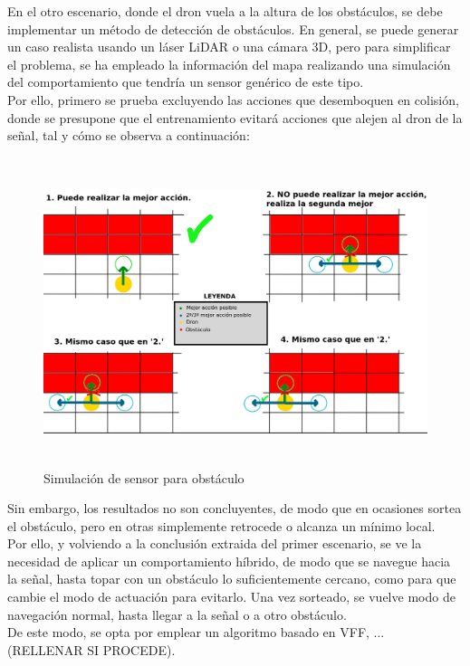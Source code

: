 En el otro escenario, donde el dron vuela a la altura de los obstáculos, se debe implementar un método de detección de obstáculos. En general, se puede generar un caso realista usando un láser LiDAR o una cámara 3D, pero para simplificar el problema, se ha empleado la información del mapa realizando una simulación del comportamiento que tendría un sensor genérico de este tipo.\\

Por ello, primero se prueba excluyendo las acciones que desemboquen en colisión, donde se presupone que el entrenamiento evitará acciones que alejen al dron de la señal, tal y cómo se observa a continuación:

\begin{figure} [H]
    \begin{center}
    \includegraphics[height=9cm]{imagenes/cap4/28_pseudosensor.png}
    \end{center}
    \caption[Simulación de sensor para obstáculo]{Simulación de sensor para obstáculo}
    \label{fig:pseudosensor}
\end{figure}

Sin embargo, los resultados no son concluyentes, de modo que en ocasiones sortea el obstáculo, pero en otras simplemente retrocede o alcanza un mínimo local.\\

Por ello, y volviendo a la conclusión extraida del primer escenario, se ve la necesidad de aplicar un comportamiento híbrido, de modo que se navegue hacia la señal, hasta topar con un obstáculo lo suficientemente cercano, como para que cambie el modo de actuación para evitarlo. Una vez sorteado, se vuelve modo de navegación normal, hasta llegar a la señal o a otro obstáculo.\\

De este modo, se opta por emplear un algoritmo basado en \ac{VFF}, ... (RELLENAR SI PROCEDE).